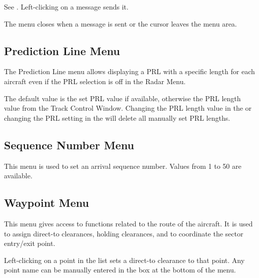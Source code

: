 \documentclass[a4paper,oneside,11pt]{memoir}
\begin{document}
See . Left-clicking on a message sends it.

\bigskip

The menu closes when a message is sent or the cursor leaves the menu area.

\subsection{Prediction Line Menu}
\label{menu:prl}


The Prediction Line menu allows displaying a PRL with a specific length for each aircraft even if the PRL selection is off in the Radar Menu.

\bigskip

The default value is the set PRL value if available, otherwise the PRL length value from the Track Control Window. Changing the PRL length value in the  or changing the PRL setting in the  will delete all manually set PRL lengths.

\subsection{Sequence Number Menu}
\label{menu:seq}


This menu is used to set an arrival sequence number. Values from 1 to 50 are available.

\bigskip


\subsection{Waypoint Menu}
\label{menu:wpt}


This menu gives access to functions related to the route of the aircraft. It is used to assign direct-to clearances, holding clearances, and to coordinate the sector entry/exit point.

\bigskip

Left-clicking on a point in the list sets a direct-to clearance to that point. Any point name can be manually entered in the box at the bottom of the menu.
\end{document}
